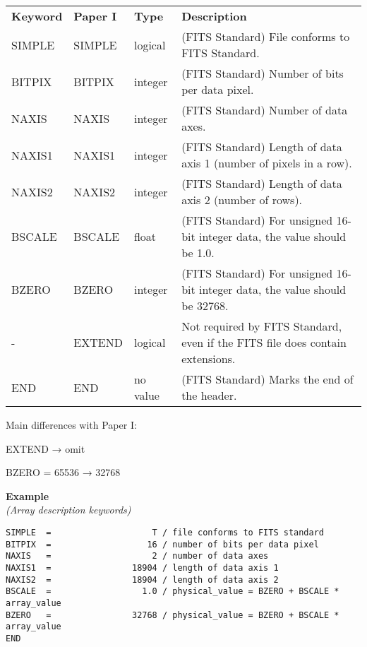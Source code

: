 \documentclass[11pt]{ivoa}
\newenvironment{fitsexample}[1]
{\bigskip\noindent\textbf{Example}\\\textit{(#1\smallskip)}}
{\medskip}
\begin{document}
\begin{inlinetable}
\footnotesize
\begin{tabular}{lllp{}}
\sptablerule
\textbf{Keyword}&\textbf{Paper I}&\textbf{Type}&\textbf{Description}\\
\sptablerule
SIMPLE     &SIMPLE     &logical     &(FITS Standard) File conforms to FITS
Standard.\\
BITPIX     &BITPIX     &integer     &(FITS Standard) Number of bits per data
pixel.\\
NAXIS     &NAXIS      &integer     &(FITS Standard) Number of data axes.\\
NAXIS1     &NAXIS1     &integer     &(FITS Standard) Length of data axis 1
(number of pixels in a row).\\
NAXIS2     &NAXIS2     &integer     &(FITS Standard) Length of data axis 2
(number of rows).\\
BSCALE     &BSCALE     &float             &(FITS Standard) For unsigned 16-bit
integer data, the value should be 1.0.\\
BZERO     &BZERO     &integer     &(FITS Standard) For unsigned 16-bit integer
data, the value should be 32768.\\
-     &EXTEND     &logical     &Not required by FITS Standard, even if the FITS
    file does contain extensions.\\
END     &END     &no value     &(FITS Standard) Marks the end of the
header.\\
\end{tabular}
\end{inlinetable}

Main differences with Paper I:

EXTEND → omit

BZERO = 65536 → 32768

\begin{fitsexample}{Array description keywords}
\begin{lstlisting}
SIMPLE  =                    T / file conforms to FITS standard
BITPIX  =                   16 / number of bits per data pixel
NAXIS   =                    2 / number of data axes
NAXIS1  =                18904 / length of data axis 1
NAXIS2  =                18904 / length of data axis 2
BSCALE  =                  1.0 / physical_value = BZERO + BSCALE * array_value
BZERO   =                32768 / physical_value = BZERO + BSCALE * array_value
END
\end{lstlisting}
\end{fitsexample}
\end{document}
